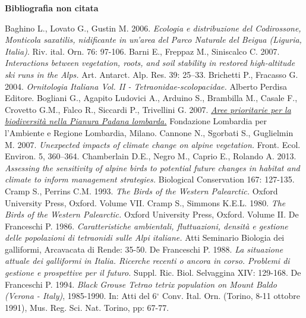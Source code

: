 \documentclass[10pt,twoside,openany,x11names,svgnames,italian,a5paper,dvipsnames,table]{memoir}
\newcommand{\backgroundrectanglecolor}{B14}
\newcommand{\backgroundrectanglecolor}{B14}
\begin{document}
\makeatletter
\renewcommand\@biblabel[1]{\textcolor{\backgroundrectanglecolor}{$\bullet$}}
\makeatother

\renewcommand*{\bibname}{Bibliografia non citata}
\textbf{\large Bibliografia non citata}
\begin{thebibliography}{9}
\footnotesize
{} Baghino L., Lovato G., Gustin M. 2006. \emph{Ecologia e distribuzione del Codirossone, \emph{Monticola saxatilis}, nidificante in un'area del Parco Naturale del Beigua (Liguria, Italia)}. Riv. ital. Orn. 76: 97-106.
 Barni E., Freppaz M., Siniscalco C. 2007. \emph{Interactions between vegetation, roots, and soil stability in restored high-altitude ski runs in the Alps.} Art. Antarct. Alp. Res. 39: 25–33.
Brichetti P., Fracasso G. 2004. \emph{Ornitologia Italiana Vol. II - \emph{Tetraonidae-scolopacidae}.} Alberto Perdisa Editore.
Bogliani G., Agapito Ludovici A., Arduino S., Brambilla M., Casale F., Crovetto G.M., Falco R., Siccardi P., Trivellini G. 2007. \href{http://www.flanet.org/it/95/pubblicazione/aree-prioritarie-la-biodiversit%C3%A0-nella-pianura-padana-lombarda}{\emph{Aree prioritarie per la biodiversità nella Pianura Padana lombarda.}} Fondazione Lombardia per l’Ambiente e Regione Lombardia, Milano.
Cannone N., Sgorbati S., Guglielmin M. 2007. \emph{Unexpected impacts of climate change on alpine vegetation.} Front. Ecol. Environ. 5, 360–364.
Chamberlain D.E., Negro M., Caprio E., Rolando A. 2013. \emph{Assessing the sensitivity of alpine birds to potential future changes in habitat and climate to inform management strategies.} Biological Conservation 167: 127-135.
Cramp S., Perrins C.M. 1993. \emph{The Birds of the Western Palearctic.} Oxford University Press, Oxford. Volume VII.
Cramp S., Simmons K.E.L. 1980. \emph{The Birds of the Western Palearctic.} Oxford University Press, Oxford. Volume II.
 De Franceschi P. 1986. \emph{Caratteristiche ambientali, fluttuazioni, densità e gestione delle popolazioni di tetraonidi sulle Alpi italiane.} Atti Seminario Biologia dei galliformi, Arcavacata di Rende: 35-50.
De Franceschi P. 1988. \emph{La situazione attuale dei galliformi in Italia. Ricerche recenti o ancora in corso. Problemi di gestione e prospettive per il futuro.} Suppl. Ric. Biol. Selvaggina XIV: 129-168.
De Franceschi P. 1994. \emph{Black Grouse \emph{Tetrao tetrix} population on Mount Baldo (Verona - Italy)}, 1985-1990. In: Atti del 6$^\circ$ Conv. Ital. Orn. (Torino, 8-11 ottobre 1991), Mus. Reg. Sci. Nat. Torino, pp: 67-77.

\end{thebibliography}
\end{document}
